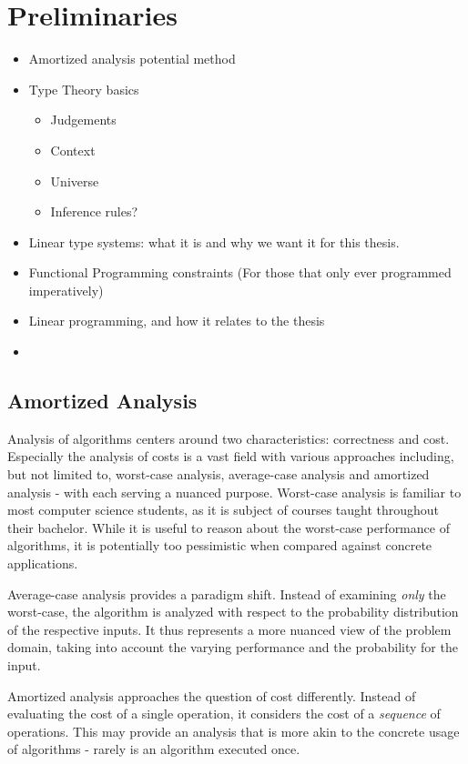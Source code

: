 \chapter{Preliminaries} \label{chap:preliminaries}
\begin{itemize}
	\item Amortized analysis potential method
	\item Type Theory basics
	   \begin{itemize}
		\item Judgements 
		\item Context
		\item Universe
		\item Inference rules?
	   \end{itemize}
   \item Linear type systems: what it is and why we want it for this thesis.
   \item Functional Programming constraints (For those that only ever programmed imperatively)
   \item Linear programming, and how it relates to the thesis
   \item 
\end{itemize}

\section{Amortized Analysis}

Analysis of algorithms centers around two characteristics: correctness and cost. Especially the analysis of costs is a vast field with various approaches including, but not limited to, worst-case analysis, average-case analysis and amortized analysis - with each serving a nuanced purpose. Worst-case analysis is familiar to most computer science students, as it is subject of courses taught throughout their bachelor. While it is useful to reason about the worst-case performance of algorithms, it is potentially too pessimistic when compared against concrete applications. 

Average-case analysis provides a paradigm shift. Instead of examining \emph{only} the worst-case, the algorithm is analyzed with respect to the probability distribution of the respective inputs. It thus represents a more nuanced view of the problem domain, taking into account the varying performance and the probability for the input. 

Amortized analysis approaches the question of cost differently. Instead of evaluating the cost of a single operation, it considers the cost of a \emph{sequence} of operations. This may provide an analysis that is more akin to the concrete usage of algorithms - rarely is an algorithm executed once.

